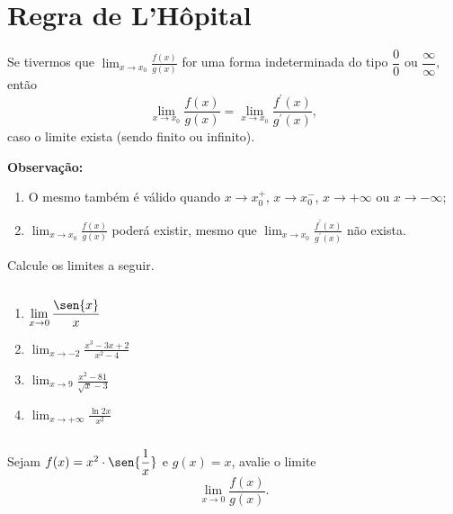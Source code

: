 \section{Regra de L'Hôpital}

\begin{frame}
  \begin{theorem}
    Se tivermos que $\displaystyle\lim_{x\to x_{0}}\frac{f(x)}{g(x)}$ for uma forma indeterminada do tipo $\dfrac{0}{0}$ ou $\dfrac{\infty}{\infty}$, então
    \begin{equation*}
      \lim_{x\to x_{0}}\frac{f(x)}{g(x)} = \lim_{x\to x_{0}}\frac{f^{\prime}(x)}{g^{\prime}(x)},
    \end{equation*}
    caso o limite exista (sendo finito ou infinito).
  \end{theorem}
  \begin{highlight}
    \textbf{Observação:}
    \begin{enumerate}
      \item O mesmo também é válido quando $x\to x_{0}^{+}$, $x\to x_{0}^{-}$, $x\to +\infty$ ou $x\to -\infty$;
      \item $\displaystyle \lim_{x\to x_{0}}\frac{f(x)}{g(x)}$ poderá existir, mesmo que $\displaystyle \lim_{x\to x_{0}}\frac{f^{\prime}(x)}{g^{\prime}(x)}$ não exista.\vspace*{-0.2cm}
    \end{enumerate}
  \end{highlight}
\end{frame}

\begin{frame}
  \begin{example}
    Calcule os limites a seguir.
  \end{example}
  \begin{columns}[onlytextwidth]
    \begin{column}{0.5\textwidth}
      \begin{enumerate}
        \item $\displaystyle\lim_{x\to 0}\frac{\sen{x}}{x}$
        \item $\displaystyle\lim_{x\to -2}\frac{x^{3}-3x+2}{x^{2}-4}$
        \item $\displaystyle\lim_{x\to 9}\frac{x^{2}-81}{\sqrt{x}-3}$
        \item $\displaystyle\lim_{x\to +\infty}\frac{\ln{2x}}{x^{2}}$
      \end{enumerate}
    \end{column}
    \begin{column}{0.5\textwidth}
    \end{column}
  \end{columns}
\end{frame}

\begin{frame}
  \begin{example}
    Sejam $f(x) = x^{2}\cdot\sen{\dfrac{1}{x}}$ e $g(x) = x$, avalie o limite
    \begin{equation*}
      \lim_{x\to 0}\frac{f(x)}{g(x)}.
    \end{equation*}
  \end{example}
\end{frame}